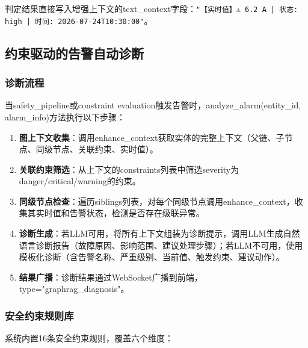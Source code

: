 \documentclass[12pt,a4paper]{article}
\begin{document}
判定结果直接写入增强上下文的text\_context字段：\texttt{"【实时值】⚠️ 6.2 A | 状态: high | 时间: 2026-07-24T10:30:00"}。

\subsection{约束驱动的告警自动诊断}

\subsubsection{诊断流程}

当safety\_pipeline或constraint evaluation触发告警时，analyze\_alarm(entity\_id, alarm\_info)方法执行以下步骤：

\begin{enumerate}
  \item \textbf{图上下文收集}：调用enhance\_context获取实体的完整上下文（父链、子节点、同级节点、关联约束、实时值）。
  \item \textbf{关联约束筛选}：从上下文的constraints列表中筛选severity为danger/critical/warning的约束。
  \item \textbf{同级节点检查}：遍历siblings列表，对每个同级节点调用enhance\_context，收集其实时值和告警状态，检测是否存在级联异常。
  \item \textbf{诊断生成}：若LLM可用，将所有上下文组装为诊断提示，调用LLM生成自然语言诊断报告（故障原因、影响范围、建议处理步骤）；若LLM不可用，使用模板化诊断（含告警名称、严重级别、当前值、触发约束、建议动作）。
  \item \textbf{结果广播}：诊断结果通过WebSocket广播到前端，type="graphrag\_diagnosis"。
\end{enumerate}

\subsubsection{安全约束规则库}

系统内置16条安全约束规则，覆盖六个维度：
\end{document}
